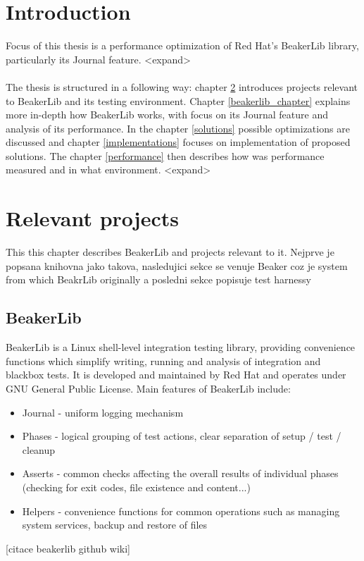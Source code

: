 
\chapter{Introduction}

Focus of this thesis is a performance optimization of Red Hat's BeakerLib library, particularly its Journal feature. <expand>
\\
\\
The thesis is structured in a following way: chapter \ref{relevant_projects} introduces projects relevant to BeakerLib and its testing environment. Chapter \ref{beakerlib_chapter} explains more in-depth how BeakerLib works, with focus on its Journal feature and analysis of its performance. In the chapter \ref{solutions} possible optimizations are discussed and chapter \ref{implementations} focuses on implementation of proposed solutions. The chapter \ref{performance} then describes how was performance measured and in what environment. <expand>

\chapter{Relevant projects}
\label{relevant_projects}

This this chapter describes BeakerLib and projects relevant to it. Nejprve je popsana knihovna jako takova, nasledujici sekce se venuje Beaker coz je system from which BeakrLib originally  a posledni sekce popisuje test harnessy

\section{BeakerLib}

BeakerLib is a Linux shell-level integration testing library, providing convenience functions which simplify writing, running and analysis of integration and blackbox tests. 
It is developed and maintained by Red Hat and operates under GNU General Public License.
Main features of BeakerLib include:
\begin{itemize}
\item Journal - uniform logging mechanism
\item Phases - logical grouping of test actions, clear separation of setup / test / cleanup
\item Asserts - common checks affecting the overall results of individual phases (checking for exit codes, file existence and content...)
\item Helpers - convenience functions for common operations such as managing system services, backup and restore of files
\end{itemize}
[citace beakerlib github wiki]

